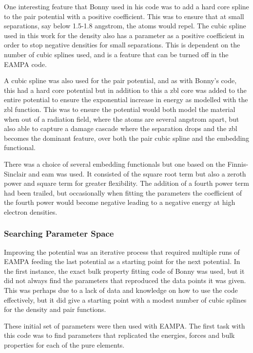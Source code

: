 One interesting feature that Bonny used in his code was to add a hard core spline to the pair potential with a positive coefficient.  This was to ensure that at small separations, say below 1.5-1.8 angstrom, the atoms would repel.  The cubic spline used in this work for the density also has a parameter as a positive coefficient in order to stop negative densities for small separations.  This is dependent on the number of cubic splines used, and is a feature that can be turned off in the EAMPA code.

A cubic spline was also used for the pair potential, and as with Bonny's code, this had a hard core potential but in addition to this a \acrshort{zbl} core was added to the entire potential to ensure the exponential increase in energy as modelled with the \acrshort{zbl} function.  This was to ensure the potential would both model the material when out of a radiation field, where the atoms are several angstrom apart, but also able to capture a damage cascade where the separation drops and the \acrshort{zbl} becomes the dominant feature, over both the pair cubic spline and the embedding functional.

There was a choice of several embedding functionals but one based on the Finnis-Sinclair and \acrshort{eam} was used.  It consisted of the square root term but also a zeroth power and square term for greater flexibility.  The addition of a fourth power term had been trailed, but occasionally when fitting the parameters the coefficient of the fourth power would become negative leading to a negative energy at high electron densities.


\subsubsection{Searching Parameter Space}

Improving the potential was an iterative process that required multiple runs of EAMPA feeding the last potential as a starting point for the next potential.  In the first instance, the exact bulk property fitting code of Bonny was used, but it did not always find the parameters that reproduced the data points it was given.  This was perhaps due to a lack of data and knowledge on how to use the code effectively, but it did give a starting point with a modest number of cubic splines for the density and pair functions.

These initial set of parameters were then used with EAMPA.  The first task with this code was to find parameters that replicated the energies, forces and bulk properties for each of the pure elements.

